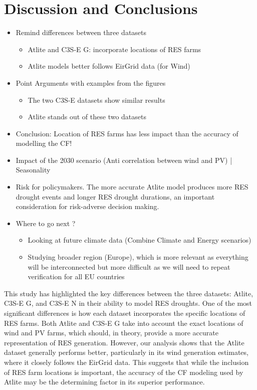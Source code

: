 \documentclass[a4paper, 11pt]{article}
\begin{document}
\newpage
\section{Discussion and Conclusions}
\label{sec:Conclusion}

\begin{itemize}
	\item Remind differences between three datasets
	\begin{itemize}
		\item Atlite and C3S-E G: incorporate locations of RES farms
		\item Atlite models better follows EirGrid data (for Wind)
	\end{itemize}
	\item Point Arguments with examples from the figures
	\begin{itemize}
		\item The two C3S-E datasets show similar results
		\item Atlite stands out of these two datasets
	\end{itemize}
	\item Conclusion: Location of RES farms has less impact than the accuracy of modelling the CF!
	\\
	\item Impact of the 2030 scenario (Anti correlation between wind and PV) | Seasonality
	\\
	\item Risk for policymakers. The more accurate Atlite model produces more RES drought events and longer RES drought durations, an important consideration for risk-adverse decision making.
	\\
	\item Where to go next ?
	\begin{itemize}
		\item Looking at future climate data (Combine Climate and Energy scenarios)
		\item Studying broader region (Europe), which is more relevant as everything will be interconnected but more difficult as we will need to repeat verification for all EU countries
	\end{itemize}
\end{itemize}

This study has highlighted the key differences between the three datasets: Atlite, C3S-E G, and C3S-E N in their ability to model RES droughts. One of the most significant differences is how each dataset incorporates the specific locations of RES farms. Both Atlite and C3S-E G take into account the exact locations of wind and PV farms, which should, in theory, provide a more accurate representation of RES generation. However, our analysis shows that the Atlite dataset generally performs better, particularly in its wind generation estimates, where it closely follows the EirGrid data. This suggests that while the inclusion of RES farm locations is important, the accuracy of the CF modeling used by Atlite may be the determining factor in its superior performance.
\end{document}
